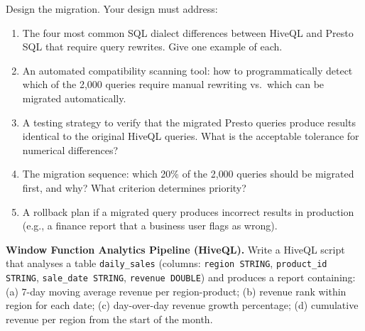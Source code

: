 Design the migration. Your design must address:
\begin{enumerate}[label=(\alph*)]
  \item The four most common SQL dialect differences between HiveQL and
        Presto SQL that require query rewrites. Give one example of each.
  \item An automated compatibility scanning tool: how to programmatically
        detect which of the 2{,}000 queries require manual rewriting
        vs.\ which can be migrated automatically.
  \item A testing strategy to verify that the migrated Presto queries
        produce results identical to the original HiveQL queries.
        What is the acceptable tolerance for numerical differences?
  \item The migration sequence: which 20\% of the 2{,}000 queries should
        be migrated first, and why? What criterion determines priority?
  \item A rollback plan if a migrated query produces incorrect results
        in production (e.g., a finance report that a business user flags
        as wrong).
\end{enumerate}

\bigskip
{}

\pe \textbf{Window Function Analytics Pipeline (HiveQL).}
Write a HiveQL script that analyses a table \texttt{daily\_sales}
(columns: \texttt{region STRING}, \texttt{product\_id STRING},
\texttt{sale\_date STRING}, \texttt{revenue DOUBLE}) and produces a
report containing:
(a) 7-day moving average revenue per region-product;
(b) revenue rank within region for each date;
(c) day-over-day revenue growth percentage;
(d) cumulative revenue per region from the start of the month.

